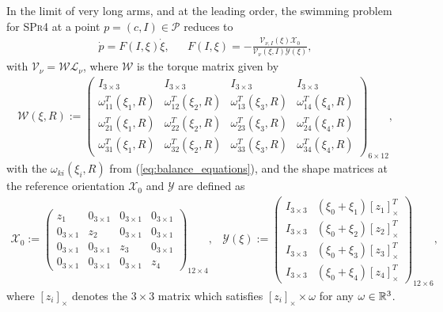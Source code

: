 \begin{proposition}
\label{prop:control_system_laa}
In the limit of very long arms, and at the leading order, the swimming problem for \textsc{SPr4} at a point $p = (c, I) \in \mathcal{P}$ reduces to
\begin{eqnarray}
\label{eq:control_system_laa}
	\dot{p} = F(I, \xi) \dot{\xi}, & &  F(I, \xi) = - \frac{\mathcal{V}_{\nu, I}( \xi) \mathcal{X}_0}{\mathcal{V}_{\nu}(\xi, I) \mathcal{Y}(\xi)},
\end{eqnarray}
with $\mathcal{V}_{\nu} = \mathcal{W} \mathcal{L}_{\nu}$, where $\mathcal{W}$ is the torque matrix given by
\begin{align}
\mathcal{W}(\xi, R) := \left (\begin{array}{cccc}
I_{3 \times 3} & I_{3 \times 3} & I_{3 \times 3} & I_{3 \times 3} \\ 
\hline
\omega_{11}^T(\xi_1, R) & \omega_{12}^T(\xi_2, R) & \omega_{13}^T(\xi_3, R) & \omega_{14}^T(\xi_4, R) \\ 
\omega_{21}^T(\xi_1, R) & \omega_{22}^T(\xi_2, R) & \omega_{23}^T(\xi_3, R) & \omega_{24}^T(\xi_4, R) \\ 
\omega_{31}^T(\xi_1, R) & \omega_{32}^T(\xi_2, R) & \omega_{33}^T(\xi_3, R) & \omega_{34}^T(\xi_4, R)
\end{array}  \right )_{6 \times 12},
\end{align}
with the $\omega_{ki}(\xi_i, R)$ from  (\ref{eq:balance_equations}), and the shape matrices at the reference orientation $\mathcal{X}_0$ and $\mathcal{Y}$ are defined as
\begin{eqnarray}
 \mathcal{X}_0 := \left ( \begin{array}{cccc}
 z_1 & 0_{3 \times 1} & 0_{3 \times 1} & 0_{3 \times 1} \\ 
 0_{3 \times 1} & z_2 & 0_{3 \times 1} & 0_{3 \times 1} \\ 
 0_{3 \times 1} & 0_{3 \times 1} & z_3 & 0_{3 \times 1} \\ 
 0_{3 \times 1} & 0_{3 \times 1} & 0_{3 \times 1} & z_4
 \end{array} \right )_{12 \times 4}, &  \mathcal{Y}(\xi) := \left ( \begin{array}{cc}
 I_{3 \times 3} & (\xi_0 + \xi_1)[z_1]^T_\times \\ 
 I_{3 \times 3} & (\xi_0 + \xi_2)[z_2]^T_\times \\ 
 I_{3 \times 3} & (\xi_0 + \xi_3)[z_3]^T_\times \\ 
 I_{3 \times 3} & (\xi_0 + \xi_4)[z_4]^T_\times
 \end{array} \right )_{12 \times 6},
\end{eqnarray}
where $[z_i]_{\times}$ denotes the $3 \times 3$ matrix which satisfies $[z_i]_{\times} \times \omega $ for any $\omega \in \mathbb{R}^3$.
\end{proposition}

